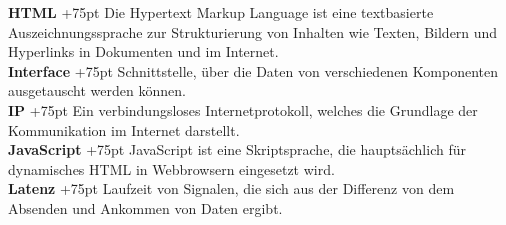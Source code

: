 \documentclass[fontsize = 12pt, paper = a4]{scrreprt}
\begin{document}
\textbf{HTML}
\hangindent+75pt 
\hspace*{9mm}
Die Hypertext Markup Language ist eine textbasierte Auszeichnungssprache zur Strukturierung von Inhalten wie Texten, Bildern und Hyperlinks in Dokumenten und im Internet.\\

\textbf{Interface}
\hangindent+75pt 
\hspace*{6mm}
Schnittstelle, über die Daten von verschiedenen Komponenten ausgetauscht werden können.\\

\textbf{IP}
\hangindent+75pt 
\hspace*{18.75mm}
Ein verbindungsloses Internetprotokoll, welches die Grundlage der Kommunikation im Internet darstellt.\\

\textbf{JavaScript}
\hangindent+75pt 
\hspace*{2.5mm}
JavaScript ist eine Skriptsprache, die hauptsächlich für dynamisches HTML in Webbrowsern eingesetzt wird. \\

\textbf{Latenz}
\hangindent+75pt 
\hspace*{10mm}
Laufzeit von Signalen, die sich aus der Differenz von dem Absenden und Ankommen von Daten ergibt.\\
\end{document}
